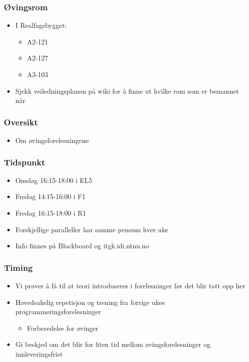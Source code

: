 \documentclass[screen, aspectratio=169]{beamer}
\begin{document}
\begin{frame}
	\frametitle{Øvingsrom}
	\begin{itemize}
	    \item I Realfagsbygget:
	    \begin{itemize}
	        \item A2-121
    	    \item A2-127
    	    \item A3-103
	    \end{itemize}
	    \vspace{2em}
	    \item Sjekk veiledningsplanen på wiki for å finne ut hvilke rom som er bemannet når
	\end{itemize}
\end{frame}

\begin{frame}
	\frametitle{Oversikt}
	\begin{itemize}
		\item Om øvingsforelesningene
	\end{itemize}
\end{frame}

\begin{frame}
	\frametitle{Tidspunkt}
	\begin{itemize}
		\item Onsdag 16:15-18:00 i EL5
		\item Fredag 14:15-16:00 i F1
		\item Fredag 16:15-18:00 i R1
		\item Forskjellige paralleller har samme pensum hver uke
		\item Info finnes på Blackboard og itgk.idi.ntnu.no
	\end{itemize}
\end{frame}

\begin{frame}
	\frametitle{Timing}
	\begin{itemize}
		\item Vi prøver å få til at teori introduseres i forelesninger før det blir tatt opp her
		\item Hovedsakelig repetisjon og trening fra forrige ukes programmeringsforelesninger
		\begin{itemize}
		    \item Forberedelse for øvinger
		\end{itemize}
		\item Gi beskjed om det blir for liten tid mellom øvingsforelesninger og innleveringsfrist
	\end{itemize}
\end{frame}
\end{document}
